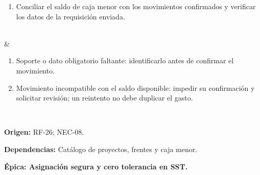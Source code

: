 \documentclass[12pt,letterpaper]{article}
\begin{document}
{\begin{enumerate}[nosep,leftmargin=*]
\item Conciliar el saldo de caja menor con los movimientos confirmados y verificar los datos de la requisición enviada.
\end{enumerate}\\\hline
{} & \begin{enumerate}[nosep,leftmargin=*]
\item Soporte o dato obligatorio faltante: identificarlo antes de confirmar el movimiento.
\item Movimiento incompatible con el saldo disponible: impedir su confirmación y solicitar revisión; un reintento no debe duplicar el gasto.
\end{enumerate}\\\hline
}
{\textbf{Origen:} RF-26; NEC-08.\par
\textbf{Dependencias:} Catálogo de proyectos, frentes y caja menor.}

\textbf{Épica: Asignación segura y cero tolerancia en SST.}\par
\end{document}
